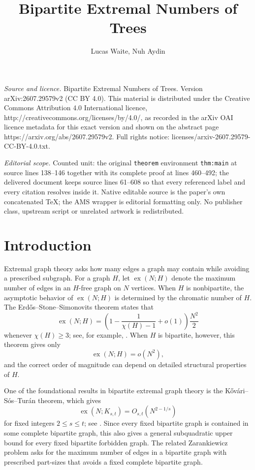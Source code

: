 \documentclass[10pt,a4paper]{amsart}
\newcommand{\ex}{\operatorname{ex}}
\begin{document}
\title[Bipartite Extremal Numbers of Trees]{Bipartite Extremal Numbers of Trees}
\author{Lucas Waite, Nuh Aydin}
\date{}
\maketitle
\noindent\emph{Source and licence.} Bipartite Extremal Numbers of Trees. Version arXiv:2607.29579v2 (CC BY 4.0). This material is distributed under the Creative Commons Attribution 4.0 International licence, http://creativecommons.org/licenses/by/4.0/, as recorded in the arXiv OAI licence metadata for this exact version and shown on the abstract page https://arxiv.org/abs/2607.29579v2. Full rights notice: licenses/arxiv-2607.29579-CC-BY-4.0.txt.\par\smallskip
\noindent\textit{Editorial scope.} Counted unit: the original \texttt{theorem} environment \texttt{thm:main} at source lines 138--146 together with its complete proof at lines 460--492; the delivered document keeps source lines 61--608 so that every referenced label and every citation resolves inside it. Native editable source is the paper's own concatenated TeX; the AMS wrapper is editorial formatting only. No publisher class, upstream script or unrelated artwork is redistributed.
\section{Introduction}

Extremal graph theory asks how many edges a graph may contain while avoiding a prescribed subgraph. For a graph $H$, let $\ex(N;H)$ denote the maximum number of edges in an $H$-free graph on $N$ vertices. When $H$ is nonbipartite, the asymptotic behavior of $\ex(N;H)$ is determined by the chromatic number of $H$. The Erd\H{o}s--Stone--Simonovits theorem states that
\[
\ex(N;H)=\left(1-\frac{1}{\chi(H)-1}+o(1)\right)\frac{N^2}{2}
\]
whenever $\chi(H)\geq 3$; see, for example,
\cite{erdosStone1946,simonovits1968}. When $H$ is bipartite, however, this theorem gives only
\[
\ex(N;H)=o(N^2),
\]
and the correct order of magnitude can depend on detailed structural properties of $H$.

One of the foundational results in bipartite extremal graph theory is the K\H{o}v\'ari--S\'os--Tur\'an theorem, which gives
\[
\ex(N;K_{s,t})=O_{s,t}\left(N^{2-1/s}\right)
\]
for fixed integers $2\leq s\leq t$; see \cite{kovari1954}. Since every fixed bipartite graph is contained in some complete bipartite graph, this also gives a general subquadratic upper bound for every fixed bipartite forbidden graph. The related Zarankiewicz problem asks for the maximum number of edges in a bipartite graph with prescribed part-sizes that avoids a fixed complete bipartite graph.
\end{document}
